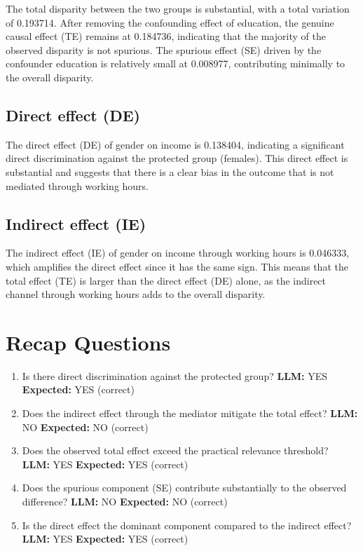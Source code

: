 \documentclass[11pt]{article}
\begin{document}
The total disparity between the two groups is substantial, with a total variation of 0.193714. After removing the confounding effect of education, the genuine causal effect (TE) remains at 0.184736, indicating that the majority of the observed disparity is not spurious. The spurious effect (SE) driven by the confounder education is relatively small at 0.008977, contributing minimally to the overall disparity.

\subsection{Direct effect (DE)}

The direct effect (DE) of gender on income is 0.138404, indicating a significant direct discrimination against the protected group (females). This direct effect is substantial and suggests that there is a clear bias in the outcome that is not mediated through working hours.

\subsection{Indirect effect (IE)}

The indirect effect (IE) of gender on income through working hours is 0.046333, which amplifies the direct effect since it has the same sign. This means that the total effect (TE) is larger than the direct effect (DE) alone, as the indirect channel through working hours adds to the overall disparity.

\section{Recap Questions}

\begin{enumerate}
\item Is there direct discrimination against the protected group? \textbf{LLM:} YES \quad \textbf{Expected:} YES \quad (correct)
\item Does the indirect effect through the mediator mitigate the total effect? \textbf{LLM:} NO \quad \textbf{Expected:} NO \quad (correct)
\item Does the observed total effect exceed the practical relevance threshold? \textbf{LLM:} YES \quad \textbf{Expected:} YES \quad (correct)
\item Does the spurious component (SE) contribute substantially to the observed difference? \textbf{LLM:} NO \quad \textbf{Expected:} NO \quad (correct)
\item Is the direct effect the dominant component compared to the indirect effect? \textbf{LLM:} YES \quad \textbf{Expected:} YES \quad (correct)
\end{enumerate}
\end{document}
